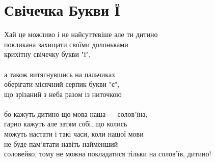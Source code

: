 \section{Свічечка Букви Ї}

Хай це можливо і не найсуттєвіше але ти дитино\\
покликана захищати своїми долоньками\\
крихітну свічечку букви "ї",
\\
\\
а також витягнувшись на пальчиках\\
оберігати місячний серпик букви "є",\\
що зрізаний з неба разом із ниточкою
\\
\\
бо кажуть дитино що мова наша — солов'їна,\\
гарно кажуть але затям собі, що колись\\
можуть настати і такі часи, коли нашої мови\\
не буде пам'ятати навіть найменший\\
соловейко, тому не можна покладатися тільки на солов'їв, дитино!

\normalsize
